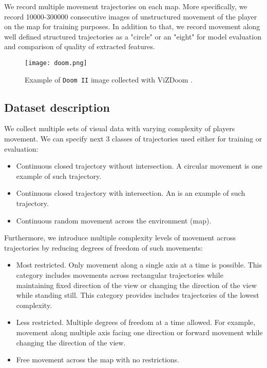 We record multiple movement trajectories on each map.
More specifically, we record 10000-300000 consecutive images of unstructured movement of the player on the map for training purposes.
In addition to that, we record movement along well defined structured trajectories as a "circle" or an "eight" for model evaluation and comparison of quality of extracted features.


\begin{figure}
\centering
\texttt{[image: doom.png]} %
\caption{Example of \texttt{Doom II} image collected with ViZDoom \cite{Kempka2016}.}
\label{fig:doom}
\end{figure}

\subsection{Dataset description}

We collect multiple sets of visual data with varying complexity of players movement.
We can specify next 3 classes of trajectories used either for training or evaluation:
\begin{itemize}
  \item Continuous closed trajectory without intersection. A circular movement is one example of such trajectory.
  \item Continuous closed trajectory with intersection. An  is an example of such trajectory.
  \item Continuous random movement across the environment (map).
\end{itemize}

Furthermore, we introduce multiple complexity levels of movement across trajectories by reducing degrees of freedom of such movements:
\begin{itemize}
  \item Most restricted. Only movement along a single axis at a time is possible. This category includes movements across rectangular trajectories while maintaining fixed direction of the view or changing the direction of the view while standing still. This category provides includes trajectories of the lowest complexity.
  \item Less restricted. Multiple degrees of freedom at a time allowed. For example, movement along multiple axis facing one direction or forward movement while changing the direction of the view.
  \item Free movement across the map with no restrictions.
\end{itemize}


